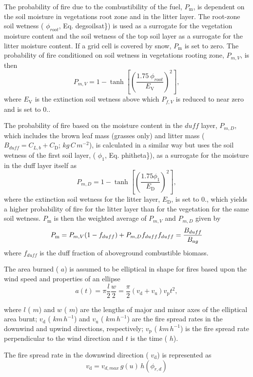 The probability of fire due to the combustibility of the fuel, $P_\mathrm{m}$, is dependent on the soil moisture in vegetation\textquotesingle{}s root zone and in the litter layer. The root-\/zone soil wetness ( $\phi_{root}$, Eq. degsoilsat\}) is used as a surrogate for the vegetation moisture content and the soil wetness of the top soil layer as a surrogate for the litter moisture content. If a grid cell is covered by snow, $P_\mathrm{m}$ is set to zero. The probability of fire conditioned on soil wetness in vegetation\textquotesingle{}s rooting zone, $P_{m,V}$, is then \[ P_{m,V} = 1-\tanh \left[\left( \frac{1.75\ \phi_{root}} {E_\mathrm{V}}\right )^2\right],\] where $E_\mathrm{V}$ is the extinction soil wetness above which $P_{f,V}$ is reduced to near zero and is set to 0..

The probability of fire based on the moisture content in the $\textit{duff}$ layer, $P_{m,D}$, which includes the brown leaf mass (grasses only) and litter mass ( $B_{duff} = C_{L,b} + C_\mathrm{D}$; $kg\,C\,m^{-2}$), is calculated in a similar way but uses the soil wetness of the first soil layer, ( $\phi_1$, Eq. phitheta\}), as a surrogate for the moisture in the duff layer itself as \[ P_{m,D} = 1 -\tanh\left[\left(\frac{1.75 \phi_1}{E_{\mathrm{D}}}\right)^2\right], \] where the extinction soil wetness for the litter layer, $E_{\mathrm{D}}$, is set to 0., which yields a higher probability of fire for the litter layer than for the vegetation for the same soil wetness. $P_\mathrm{m}$ is then the weighted average of $P_{m,V}$ and $P_{m,D}$ given by \[ \label{eqn:Pf} P_\mathrm{m} = P_{m,V} (1-f_{duff}) + P_{m,D} f_{duff} \nonumber \\ f_{duff}=\frac{B_{duff}}{B_{ag}}\] where $f_{duff}$ is the duff fraction of aboveground combustible biomass.

The area burned ( $a$) is assumed to be elliptical in shape for fires based upon the wind speed and properties of an ellipse \[ a(t)=\pi \frac{l}{2}\frac{w}{2}= \frac{\pi}{2} (v_\mathrm{d}+v_\mathrm{u})v_\mathrm{p}t^2,\]

where $l$ ( $m$) and $w$ ( $m$) are the lengths of major and minor axes of the elliptical area burnt; $v_\mathrm{d}$ ( $km\,h^{-1}$) and $v_\mathrm{u}$ ( $km\,h^{-1}$) are the fire spread rates in the downwind and upwind directions, respectively; $v_\mathrm{p}$ ( $km\,h^{-1}$) is the fire spread rate perpendicular to the wind direction and $t$ is the time ( $h$).

The fire spread rate in the downwind direction ( $v_\mathrm{d}$) is represented as \[ \label{firespreadrate} v_\mathrm{d} = v_{d,max}\,g(u)\,h(\phi_{r, d})\]

